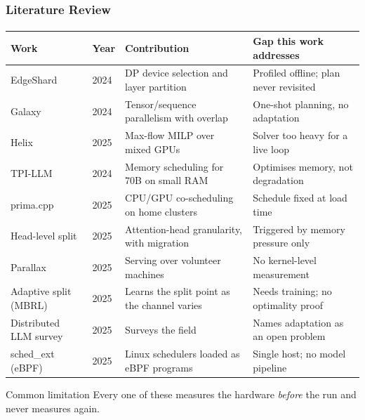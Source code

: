 \documentclass[aspectratio=169,11pt]{beamer}
\begin{document}
\begin{frame}
  \frametitle{Literature Review}
  \framesubtitle{}
  \vspace{-0.4em}
  {\scriptsize
  \renewcommand{\arraystretch}{1.15}
  \begin{tabular}{@{}p{}p{}p{}p{}@{}}
    \toprule
    \textbf{Work} & \textbf{Year} & \textbf{Contribution} &
      \textbf{Gap this work addresses}\\
    \midrule
    EdgeShard & 2024 & DP device selection and layer partition &
      Profiled offline; plan never revisited\\
    Galaxy & 2024 & Tensor/sequence parallelism with overlap &
      One-shot planning, no adaptation\\
    Helix & 2025 & Max-flow MILP over mixed GPUs &
      Solver too heavy for a live loop\\
    TPI-LLM & 2024 & Memory scheduling for 70B on small RAM &
      Optimises memory, not degradation\\
    prima.cpp & 2025 & CPU/GPU co-scheduling on home clusters &
      Schedule fixed at load time\\
    Head-level split & 2025 & Attention-head granularity, with migration &
      Triggered by memory pressure only\\
    Parallax & 2025 & Serving over volunteer machines &
      No kernel-level measurement\\
    Adaptive split (MBRL) & 2025 & Learns the split point as the channel varies &
      Needs training; no optimality proof\\
    Distributed LLM survey & 2025 & Surveys the field &
      Names adaptation as an open problem\\
    sched\_ext (eBPF) & 2025 & Linux schedulers loaded as eBPF programs &
      Single host; no model pipeline\\
    \bottomrule
  \end{tabular}}
  \vfill
  \begin{block}{Common limitation}
    Every one of these measures the hardware \emph{before} the run and never
    measures again.
  \end{block}
\end{frame}
\end{document}
